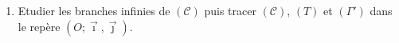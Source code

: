 \begin{exo}
\begin{enumerate}
\begin{enumerate}
                              $I$ que l'on d\'eterminera.
                              Exprimer $g^{-1} (x)$ en fonction de $x$.
                              On note par $(\Gamma')$ la courbe repr\'esentative de $g^{-1}$.
                  \end{enumerate}
                        \item Etudier les branches infinies de $(\mathscr{C})$
                              puis tracer $(\mathscr{C})$, $(T)$ et $(\Gamma')$
                              dans le rep\`ere $(O ; \vec{\imath} , \vec{\jmath})$.
            \end{enumerate}
      \end{exo}



















